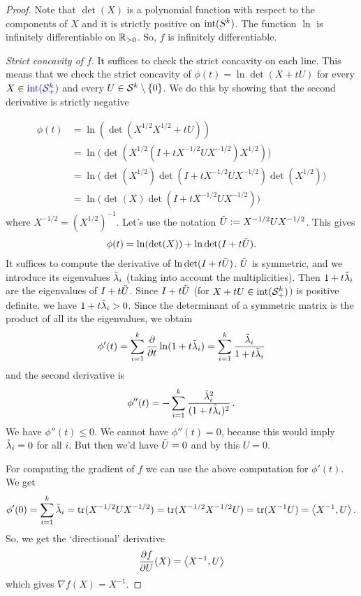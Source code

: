 \begin{proof}
	Note that $\det(X)$ is a polynomial function with respect to the components of $X$ and it is strictly positive on $\operatorname{int}(S^k)$. The function $\ln$ is infinitely differentiable on $\mathbb{R}_{>0}$. So, $f$ is infinitely differentiable. 
	
	\emph{Strict concavity of $f$}. It suffices to check the strict concavity on each line. This means that we check the strict concavity of $\phi(t) = \ln \det(X+ t U)$ for every $X \in \textcolor{blue}{\operatorname{int}(\mathcal{S}_+^k) }$ and every $U \in \mathcal{S}^k \setminus \{0\}$. We do this by showing that the second derivative is strictly negative
	
	\begin{align*}
		\phi(t) & = \ln ( \det(X^{1/2} X^{1/2} + t U) )
		\\ & =  \ln \bigl(\det(X^{1/2} (I + t X^{-1/2} U X^{-1/2}) X^{1/2}) \bigr)
		\\ & = \ln \bigl( \det(X^{1/2}) \det(I + t X^{-1/2} U X^{-1/2}) \det(X^{1/2}) \bigr)
		\\ & = \ln \bigl( \det(X) \det(I+ t X^{-1/2} U X^{-1/2}) \bigr)
	\end{align*}
	where $X^{-1/2} = (X^{1/2})^{-1}$. Let's use the notation  $\Tilde{U}:=X^{-1/2} U X^{-1/2}$. This gives
	\begin{align*}
		\phi(t) = \ln(\det(X)) + \ln \det(I+ t \Tilde{U}).
	\end{align*}
	It suffices to compute the derivative of $\ln \det(I + t \Tilde{U})$. $\Tilde{U}$ is symmetric, and we introduce its eigenvalues $\Tilde{\lambda}_i$ (taking into account the multiplicities). Then $1 + t \Tilde{\lambda}_i$ are the eigenvalues of $I + t \Tilde{U}$. Since $I + t \Tilde{U}$ (for $X + t U \in \operatorname{int}(\mathcal{S}_+^k)$) is positive definite, we have $1 + t \Tilde{\lambda}_i > 0$. Since the determinant of a symmetric matrix is the product of all its the eigenvalues, we obtain 
	\[
		\phi'(t) = \sum_{i=1}^k \frac{\partial {}}{\partial {t}} \ln(1+ t \Tilde{\lambda}_i) = \sum_{i=1}^k \frac{\Tilde{\lambda}_i}{1 + t \Tilde{\lambda}_i}
	\]
	and the second derivative is 
	\[
		\phi''(t) = - \sum_{i=1}^k \frac{ \Tilde{\lambda}_i^2}{ (1 + t \Tilde{\lambda}_i)^2} \,.
	\]
	We have $\phi''(t) \le 0$. We cannot have $\phi''(t) = 0$, because this would imply $\Tilde{\lambda}_i = 0$ for all $i$. But then we'd have $\Tilde{U} = 0$ and by this $U = 0$.
	
	For computing the gradient of $f$ we can use the above computation for  $\phi'(t)$. We get
	\[
		\phi'(0)= \sum_{i=1}^k \Tilde{\lambda}_i = \operatorname{tr}(X^{-1/2} U X^{-1/2}) = \operatorname{tr}( X^{-1/2} X^{-1/2} U) = \operatorname{tr}(X^{-1} U) = \left\langle X^{-1} , U \right\rangle.
	\]
	So, we get the `directional' derivative
	\[
		\frac{\partial {f}}{\partial {U}}(X) = \left\langle X^{-1} , U \right\rangle
	\]
	which gives $\nabla f(X) = X^{-1}$. 
	

\end{proof}
